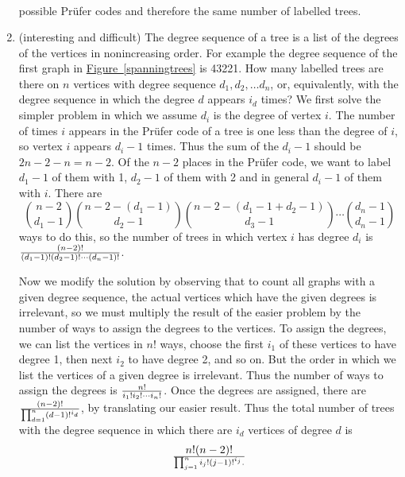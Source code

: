 \documentclass[10pt,]{book}
\theoremstyle{plain}
\theoremstyle{definition}
\numberwithin{equation}{chapter}
\begin{document}
\begin{enumerate}
\begin{align*}
\end{align*}
possible Prüfer codes and therefore the same number of labelled trees.%
%
\item\hypertarget{li-46}{}(interesting and difficult) The degree sequence of a tree is a list of the degrees of the vertices in nonincreasing order.  For example the degree sequence of the first graph in \hyperref[spanningtrees]{Figure~\ref{spanningtrees}} is 43221.  How many labelled trees are there on \(n\) vertices with degree sequence \(d_1,d_2,\ldots d_n\), or, equivalently, with the degree sequence in which the degree \(d\) appears \(i_d\) times? We first solve the simpler problem in which we assume \(d_i\) is the degree of vertex \(i\). The number of times \(i\) appears in the Prüfer code of a tree is one less than the degree of \(i\), so vertex \(i\) appears \(d_i-1\) times. Thus the sum of the \(d_i-1\) should be \(2n-2-n=n-2\). Of the \(n-2\) places in the Prüfer code, we want to label \(d_1-1\) of them with 1, \(d_2-1\) of them with 2 and in general \(d_i-1\) of them with \(i\). There are%
\begin{equation*}
{n-2\choose
d_1-1}{n-2-(d_1-1)\choose d_2-1}{n-2-(d_1-1+d_2-1)\choose
d_3-1}\cdots{d_n-1\choose d_n-1}
\end{equation*}
ways to do this, so the number of trees in which vertex \(i\) has degree \(d_i\) is \({(n-2)!\over
(d_1-1)!(d_2-1)!\cdots(d_n-1)!}\).%
\par
Now we modify the solution by observing that to count all graphs with a given degree sequence, the actual vertices which have the given degrees is irrelevant, so we must multiply the result of the easier problem by the number of ways to assign the degrees to the vertices. To assign the degrees, we can list the vertices in \(n!\) ways, choose the first \(i_1\) of these vertices to have degree 1, then next \(i_2\) to have degree 2, and so on. But the order in which we list the vertices of a given degree is irrelevant. Thus the number of ways to assign the degrees is \(n!\over i_1!i_2!\cdots i_n!\). Once the degrees are assigned, there are \((n-2)!\over
\prod_{d=1}^n (d-1)!^{i_d}\), by translating our easier result. Thus the total number of trees with the degree sequence in which there are \(i_d\) vertices of degree \(d\) is%
\begin{equation*}
n!(n-2)!\over\prod_{j=1}^n i_j!(j-1)!^{i_j}.
\end{equation*}
%
%
\end{enumerate}
\typeout{************************************************}
\typeout{************************************************}
\end{document}
